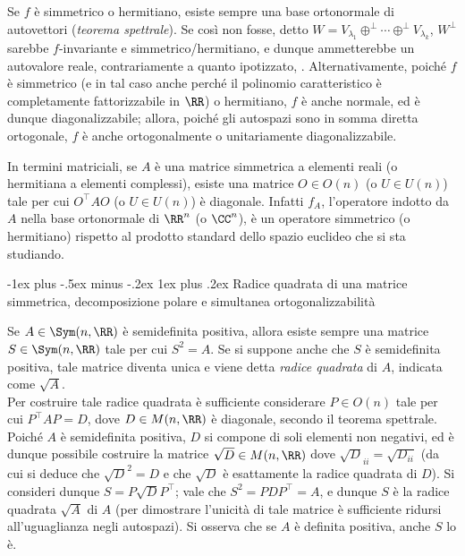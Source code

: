 \documentclass[10pt,landscape]{article}
\makeatletter
\renewcommand{\subsubsection}{\@startsection{subsubsection}{3}{0mm}%
	{-1ex plus -.5ex minus -.2ex}%
	{1ex plus .2ex}%
	{\normalfont\small\bfseries}}
\makeatother
\begin{document}
\begin{multicols}{3}
		Se $f$ è simmetrico o hermitiano, esiste sempre una
		base ortonormale di autovettori (\textit{teorema spettrale}). Se così non fosse, detto $W = V_{\lambda_1} \oplus^\perp \cdots \oplus^\perp V_{\lambda_k}$, $W^\perp$ sarebbe $f$-invariante e simmetrico/hermitiano, e dunque ammetterebbe un autovalore reale, contrariamente a quanto ipotizzato, \Lightning. Alternativamente, poiché
		$f$ è simmetrico (e in tal caso anche perché il
		polinomio caratteristico è completamente fattorizzabile in $\RR$) o hermitiano, $f$ è anche
		normale, ed è dunque diagonalizzabile; allora, poiché gli autospazi sono in somma diretta ortogonale, $f$ è anche ortogonalmente o unitariamente diagonalizzabile. \\ \vskip 0.05in
		
		In termini matriciali, se $A$ è una matrice
		simmetrica a elementi reali (o hermitiana a elementi complessi), esiste una matrice $O \in O(n)$ (o $U \in U(n)$) tale per cui $O^\top A O$ (o $U \in U(n)$) è diagonale. Infatti $f_A$, l'operatore
		indotto da $A$ nella base ortonormale di $\RR^n$ (o $\CC^n$), è un operatore simmetrico (o hermitiano) rispetto al prodotto standard dello
		spazio euclideo che si sta studiando.
		
		\subsubsection{Radice quadrata di una matrice simmetrica, decomposizione polare e simultanea ortogonalizzabilità}
		
		Se $A \in \Sym(n, \RR)$ è semidefinita positiva, allora
		esiste sempre una matrice $S \in \Sym(n, \RR)$ tale
		per cui $S^2 = A$. Se si suppone anche che $S$ è
		semidefinita positiva, tale matrice diventa unica e
		viene detta \textit{radice quadrata} di $A$, indicata come $\sqrt{A}$. \\
		
		Per costruire tale radice quadrata è sufficiente
		considerare $P \in O(n)$ tale per cui
		$P^\top A P = D$, dove $D \in M(n, \RR)$ è
		diagonale, secondo il teorema spettrale. Poiché $A$ è semidefinita positiva, $D$
		si compone di soli elementi non negativi, ed è
		dunque possibile costruire la matrice $\sqrt{D} \in M(n, \RR)$ dove $\sqrt{D}_{ii} = \sqrt{D_{ii}}$ (da cui si deduce che $\sqrt{D}^2 = D$ e che $\sqrt{D}$ è esattamente la radice quadrata di $D$).
		Si consideri dunque $S = P \sqrt{D} P^\top$; vale
		che $S^2 = P D P^\top = A$, e dunque $S$ è la
		radice quadrata $\sqrt{A}$ di $A$ (per dimostrare l'unicità di tale matrice è sufficiente ridursi all'uguaglianza negli autospazi). Si osserva che
		se $A$ è definita positiva, anche $S$ lo è. \\ \vskip 0.05in
		

\end{multicols}
\end{document}

